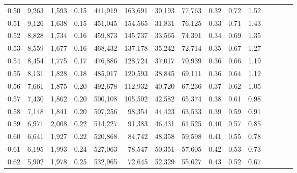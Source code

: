 \begin{tabular}{rrrcrrrrrrrrrrr}
0.50 &   9,263 &  1,593 &                                       0.15 &  441,919 &  163,691 &   30,193 &   77,763 &  0.32 &  0.72 &                         1.52 \\
0.51 &   9,126 &  1,638 &                                       0.15 &  451,045 &  154,565 &   31,831 &   76,125 &  0.33 &  0.71 &                         1.43 \\
0.52 &   8,828 &  1,734 &                                       0.16 &  459,873 &  145,737 &   33,565 &   74,391 &  0.34 &  0.69 &                         1.35 \\
0.53 &   8,559 &  1,677 &                                       0.16 &  468,432 &  137,178 &   35,242 &   72,714 &  0.35 &  0.67 &                         1.27 \\
0.54 &   8,454 &  1,775 &                                       0.17 &  476,886 &  128,724 &   37,017 &   70,939 &  0.36 &  0.66 &                         1.19 \\
0.55 &   8,131 &  1,828 &                                       0.18 &  485,017 &  120,593 &   38,845 &   69,111 &  0.36 &  0.64 &                         1.12 \\
0.56 &   7,661 &  1,875 &                                       0.20 &  492,678 &  112,932 &   40,720 &   67,236 &  0.37 &  0.62 &                         1.05 \\
0.57 &   7,430 &  1,862 &                                       0.20 &  500,108 &  105,502 &   42,582 &   65,374 &  0.38 &  0.61 &                         0.98 \\
0.58 &   7,148 &  1,841 &                                       0.20 &  507,256 &   98,354 &   44,423 &   63,533 &  0.39 &  0.59 &                         0.91 \\
0.59 &   6,971 &  2,008 &                                       0.22 &  514,227 &   91,383 &   46,431 &   61,525 &  0.40 &  0.57 &                         0.85 \\
0.60 &   6,641 &  1,927 &                                       0.22 &  520,868 &   84,742 &   48,358 &   59,598 &  0.41 &  0.55 &                         0.78 \\
0.61 &   6,195 &  1,993 &                                       0.24 &  527,063 &   78,547 &   50,351 &   57,605 &  0.42 &  0.53 &                         0.73 \\
0.62 &   5,902 &  1,978 &                                       0.25 &  532,965 &   72,645 &   52,329 &   55,627 &  0.43 &  0.52 &                         0.67 \\

\end{tabular}
